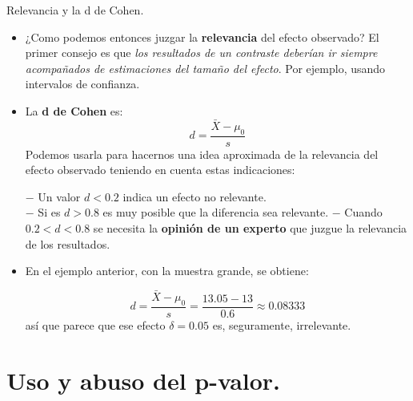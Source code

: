 \documentclass[
  9pt,
  ignorenonframetext,
]{beamer}
\begin{document}
\begin{frame}{Relevancia y la d de Cohen.}
\protect\hypertarget{relevancia-y-la-d-de-cohen.}{}

\begin{itemize}
\item
  ¿Como podemos entonces juzgar la \textbf{relevancia} del efecto
  observado? El primer consejo es que \emph{los resultados de un
  contraste deberían ir siempre acompañados de estimaciones del tamaño
  del efecto}. Por ejemplo, usando intervalos de confianza.
\item
  La \textbf{d de Cohen} es: \[d = \dfrac{\bar X - \mu_0}{s}\] Podemos
  usarla para hacernos una idea aproximada de la relevancia del efecto
  observado teniendo en cuenta estas indicaciones:

  \(-\) Un valor \(d < 0.2\) indica un efecto no relevante.\\
  \(-\) Si es \(d > 0.8\) es muy posible que la diferencia sea
  relevante. \(-\) Cuando \(0.2 < d < 0.8\) se necesita la
  \textbf{opinión de un experto} que juzgue la relevancia de los
  resultados.
\item
  En el ejemplo anterior, con la muestra grande, se obtiene:

  \[
  d = \dfrac{\bar X - \mu_0}{s} =
  \dfrac{13.05 - 13}{0.6}\approx
  0.08333
  \] así que parece que ese efecto \(\delta = 0.05\) es, seguramente,
  irrelevante.
\end{itemize}

\end{frame}

\hypertarget{uso-y-abuso-del-p-valor.-1}{%
\section{Uso y abuso del p-valor.}\label{uso-y-abuso-del-p-valor.-1}}
\end{document}
